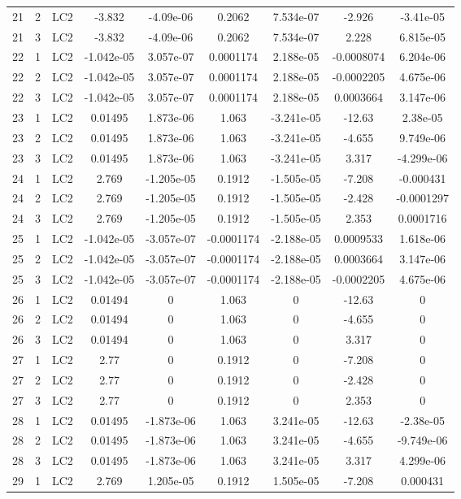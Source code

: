 \documentclass{article}%
\begin{document}
\begin{longtable}{| c c c | c c c c c c |}
21&2&LC2&{-}3.832&{-}4.09e{-}06&0.2062&7.534e{-}07&{-}2.926&{-}3.41e{-}05\\%
21&3&LC2&{-}3.832&{-}4.09e{-}06&0.2062&7.534e{-}07&2.228&6.815e{-}05\\%
22&1&LC2&{-}1.042e{-}05&3.057e{-}07&0.0001174&2.188e{-}05&{-}0.0008074&6.204e{-}06\\%
22&2&LC2&{-}1.042e{-}05&3.057e{-}07&0.0001174&2.188e{-}05&{-}0.0002205&4.675e{-}06\\%
22&3&LC2&{-}1.042e{-}05&3.057e{-}07&0.0001174&2.188e{-}05&0.0003664&3.147e{-}06\\%
23&1&LC2&0.01495&1.873e{-}06&1.063&{-}3.241e{-}05&{-}12.63&2.38e{-}05\\%
23&2&LC2&0.01495&1.873e{-}06&1.063&{-}3.241e{-}05&{-}4.655&9.749e{-}06\\%
23&3&LC2&0.01495&1.873e{-}06&1.063&{-}3.241e{-}05&3.317&{-}4.299e{-}06\\%
24&1&LC2&2.769&{-}1.205e{-}05&0.1912&{-}1.505e{-}05&{-}7.208&{-}0.000431\\%
24&2&LC2&2.769&{-}1.205e{-}05&0.1912&{-}1.505e{-}05&{-}2.428&{-}0.0001297\\%
24&3&LC2&2.769&{-}1.205e{-}05&0.1912&{-}1.505e{-}05&2.353&0.0001716\\%
25&1&LC2&{-}1.042e{-}05&{-}3.057e{-}07&{-}0.0001174&{-}2.188e{-}05&0.0009533&1.618e{-}06\\%
25&2&LC2&{-}1.042e{-}05&{-}3.057e{-}07&{-}0.0001174&{-}2.188e{-}05&0.0003664&3.147e{-}06\\%
25&3&LC2&{-}1.042e{-}05&{-}3.057e{-}07&{-}0.0001174&{-}2.188e{-}05&{-}0.0002205&4.675e{-}06\\%
26&1&LC2&0.01494&0&1.063&0&{-}12.63&0\\%
26&2&LC2&0.01494&0&1.063&0&{-}4.655&0\\%
26&3&LC2&0.01494&0&1.063&0&3.317&0\\%
27&1&LC2&2.77&0&0.1912&0&{-}7.208&0\\%
27&2&LC2&2.77&0&0.1912&0&{-}2.428&0\\%
27&3&LC2&2.77&0&0.1912&0&2.353&0\\%
28&1&LC2&0.01495&{-}1.873e{-}06&1.063&3.241e{-}05&{-}12.63&{-}2.38e{-}05\\%
28&2&LC2&0.01495&{-}1.873e{-}06&1.063&3.241e{-}05&{-}4.655&{-}9.749e{-}06\\%
28&3&LC2&0.01495&{-}1.873e{-}06&1.063&3.241e{-}05&3.317&4.299e{-}06\\%
29&1&LC2&2.769&1.205e{-}05&0.1912&1.505e{-}05&{-}7.208&0.000431\\%

\end{longtable}
\end{document}
